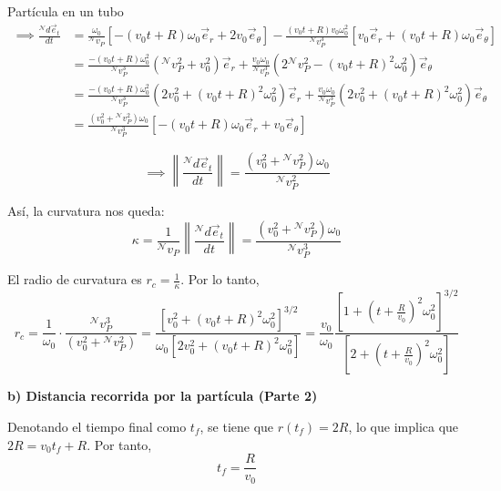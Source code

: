 \begin{solucion}{Partícula en un tubo}
\[
\begin{aligned}
\implies \frac{{}^{\mathcal{N}}d\vec{e}_t}{dt} &= \frac{\omega_0}{{}^{\mathcal{N}}v_P} \left[ -(v_0 t + R)\omega_0 \vec{e}_r + 2 v_0 \vec{e}_\theta \right] - \frac{(v_0 t + R) v_0 \omega_0^2}{{}^{\mathcal{N}}v_P^3} \left[ v_0 \vec{e}_r + (v_0 t + R)\omega_0 \vec{e}_\theta \right] \\[6pt]
&= \frac{-(v_0 t + R)\omega_0^2}{{}^{\mathcal{N}}v_P^3}\left({}^{\mathcal{N}}v_P^2 + v_0^2\right)\vec{e}_r + \frac{v_0 \omega_0}{{}^{\mathcal{N}}v_P^3}\left(2 {}^{\mathcal{N}}v_P^2 - (v_0 t + R)^2 \omega_0^2\right)\vec{e}_\theta \\[6pt]
&= \frac{-(v_0 t + R)\omega_0^2}{{}^{\mathcal{N}}v_P^3}\left(2 v_0^2 + (v_0 t + R)^2 \omega_0^2\right)\vec{e}_r + \frac{v_0 \omega_0}{{}^{\mathcal{N}}v_P^3}\left(2 v_0^2 + (v_0 t + R)^2 \omega_0^2\right)\vec{e}_\theta \\[6pt]
&= \frac{(v_0^2 + {}^{\mathcal{N}}v_P^2)\omega_0}{{}^{\mathcal{N}}v_P^3} \left[ -(v_0 t + R)\omega_0 \vec{e}_r + v_0 \vec{e}_\theta \right]
\end{aligned}
\]

\[
\implies \left\| \frac{{}^{\mathcal{N}}d\vec{e}_t}{dt} \right\| = \frac{(v_0^2 + {}^{\mathcal{N}}v_P^2)\omega_0}{{}^{\mathcal{N}}v_P^2}
\]

\vspace{0.3cm}

\noindent Así, la curvatura nos queda:
\[
\kappa = \frac{1}{{}^{\mathcal{N}}v_P} \left\| \frac{{}^{\mathcal{N}}d\vec{e}_t}{dt} \right\| = \frac{(v_0^2 + {}^{\mathcal{N}}v_P^2)\omega_0}{{}^{\mathcal{N}}v_P^3}
\]

\noindent El radio de curvatura es $r_c = \frac{1}{\kappa}$. Por lo tanto,
\[
\boxed{r_c = \frac{1}{\omega_0} \cdot \frac{{}^{\mathcal{N}}v_P^3}{(v_0^2 + {}^{\mathcal{N}}v_P^2)} = \frac{\left[ v_0^2 + (v_0 t + R)^2 \omega_0^2 \right]^{3/2}}{\omega_0 \left[ 2 v_0^2 + (v_0 t + R)^2 \omega_0^2 \right]} = \frac{v_0}{\omega_0} \frac{\left[ 1 + \left(t + \frac{R}{v_0}\right)^2 \omega_0^2 \right]^{3/2}}{\left[ 2 + \left(t + \frac{R}{v_0}\right)^2 \omega_0^2 \right]}}
\]

\vspace{0.8cm}

\noindent\textbf{b) Distancia recorrida por la partícula (Parte 2)}

\vspace{0.2cm}

\noindent Denotando el tiempo final como $t_f$, se tiene que $r(t_f) = 2R$, lo que implica que $2R = v_0 t_f + R$. Por tanto,
\[
\boxed{t_f = \frac{R}{v_0}}
\]


\end{solucion}
